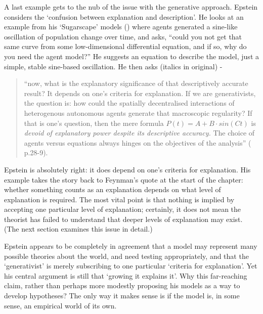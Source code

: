 A last example gets to the nub of the issue with the generative approach. Epstein considers the `confusion between explanation and description'.  He looks at an example from his `Sugarscape' models (\citealt{epstein_growing_1996}) where agents generated a sine-like oscillation of population change over time, and asks, ``could you not get that same curve from some low-dimensional differential equation, and if so, why do you need the agent model?'' He suggests an equation to describe the model, just a simple, stable sine-based oscillation. He then asks (italics in original) - 

\begin{quote}
``now, what is the explanatory significance of that descriptively accurate result? It depends on one's criteria for explanation. If we are generativists, the question is: how could the spatially decentralised interactions of heterogenous autonomous agents generate that macroscopic regularity? If that is one's question, then the mere formula $P(t) = A + B\cdot sin (Ct)$ is \emph{devoid of explanatory power despite its descriptive accuracy.} The choice of agents versus equations always hinges on the objectives of the analysis'' (\citealt{epstein_generative_2006} p.28-9).
\end{quote}

Epstein is absolutely right: it does depend on one's criteria for explanation. His example takes the story back to Feynman's quote at the start of the chapter: whether something counts as an explanation depends on what level of explanation is required. The most vital point is that nothing is implied by accepting one particular level of explanation; certainly, it does not mean the theorist has failed to understand that deeper levels of explanation may exist. (The next section examines this issue in detail.)

Epstein appears to be completely in agreement that a model may represent many possible theories about the world, and need testing appropriately, and that the `generativist' is merely subscribing to one particular `criteria for explanation'. Yet his central argument is still that `growing it explains it'. Why this far-reaching claim, rather than perhaps more modestly proposing his models as a way to develop hypotheses? The only way it makes sense is if the model is, in some sense, an empirical world of its own.

